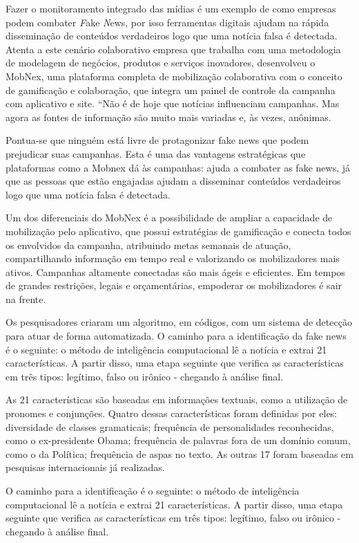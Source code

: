 Fazer o monitoramento integrado das mídias é um exemplo de como empresas podem combater \textit Fake \textit News, por isso ferramentas digitais ajudam na rápida disseminação de conteúdos verdadeiros logo que uma notícia falsa é detectada. Atenta a este cenário colaborativo empresa que trabalha com uma metodologia de modelagem de negócios, produtos e serviços inovadores, desenvolveu o MobNex, uma plataforma completa de mobilização colaborativa com o conceito de gamificação e colaboração, que integra um painel de controle da campanha com aplicativo e site. “Não é de hoje que notícias influenciam campanhas. Mas agora as fontes de informação são muito mais variadas e, às vezes, anônimas.

Pontua-se que ninguém está livre de protagonizar fake news que podem prejudicar suas campanhas. Esta é uma das vantagens estratégicas que plataformas como a Mobnex dá às campanhas: ajuda a combater as fake news, já que as pessoas que estão engajadas ajudam a disseminar conteúdos verdadeiros logo que uma notícia falsa é detectada.

Um dos diferenciais do MobNex é a possibilidade de ampliar a capacidade de mobilização pelo aplicativo, que possui estratégias de gamificação e conecta todos os envolvidos da campanha, atribuindo metas semanais de atuação, compartilhando informação em tempo real e valorizando os mobilizadores mais ativos. Campanhas altamente conectadas são mais ágeis e eficientes. Em tempos de grandes restrições, legais e orçamentárias, empoderar os mobilizadores é sair na frente. 

Os pesquisadores criaram um algoritmo, em códigos, com um sistema de detecção para atuar de forma automatizada. O caminho para a identificação da fake news é o seguinte: o método de inteligência computacional lê a notícia e extrai 21 características. A partir disso, uma etapa seguinte que verifica as características em três tipos: legítimo, falso ou irônico - chegando à análise final.

As 21 características são baseadas em informações textuais, como a utilização de pronomes e conjunções. Quatro dessas características foram definidas por eles: diversidade de classes gramaticais; frequência de personalidades reconhecidas, como o ex-presidente Obama; frequência de palavras fora de um domínio comum, como o da Política; frequência de aspas no texto. As outras 17 foram baseadas em pesquisas internacionais já realizadas.     

O caminho para a identificação é o seguinte: o método de inteligência computacional lê a notícia e extrai 21 características. A partir disso, uma etapa seguinte que verifica as características em três tipos: legítimo, falso ou irônico - chegando à análise final.

